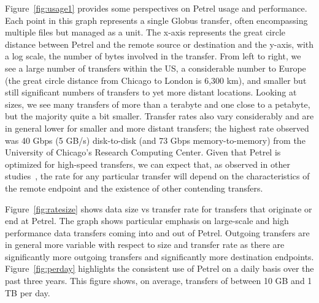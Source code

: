 \documentclass[sigconf]{acmart}
\begin{document}
Figure~\ref{fig:usage1} provides some perspectives on Petrel usage and performance.
Each point in this graph represents a single Globus transfer, often encompassing multiple files but
managed as a unit.
The x-axis represents the great circle distance between Petrel and the remote source or destination
and the y-axis, with a log scale, the number of bytes involved in the transfer.
From left to right, we see a large number of transfers within the US, a considerable number to Europe
(the great circle distance from Chicago to London is 6,300 km),
and smaller but still significant numbers of transfers to yet more distant locations.
Looking at sizes, we see many transfers of more than a terabyte and one close to a petabyte, 
but the majority quite a bit smaller.
Transfer rates also vary considerably and are in general lower for smaller and more distant transfers;
the highest rate observed was 40 Gbps (5 GB/s) disk-to-disk (and 73 Gbps memory-to-memory)
from the University of Chicago's Research
Computing Center.     
Given that Petrel is optimized for high-speed transfers,
we can expect that, as observed in other studies~\cite{allcock2005globus,ito2005parameter,kim2015highly,yildirim2016application,liu2017explaining}, 
the rate for any particular transfer will depend on the characteristics of the remote endpoint and
the existence of other contending transfers.  

Figure~\ref{fig:ratesize} shows data size vs transfer rate for 
transfers that originate or end at Petrel. The graph shows
particular emphasis on large-scale and high performance data
transfers coming into and out of Petrel. Outgoing transfers
are in general more variable with respect to size and transfer
rate as there are significantly more outgoing transfers and 
significantly more destination endpoints. 
Figure~\ref{fig:perday} highlights the consistent use of Petrel
on a daily basis over the past three years. This figure
shows, on average, transfers of between 10 GB and 1 TB per day.



% 
% 
% 
% 
% 
% 
\end{document}
